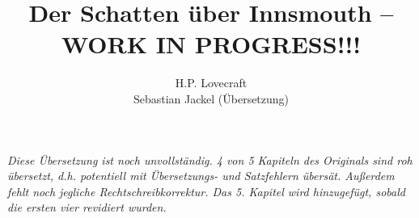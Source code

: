 \documentclass[a4paper,openany]{memoir}
\begin{document}
\title{Der Schatten über Innsmouth -- WORK IN PROGRESS!!!}
\author{H.P. Lovecraft\\
		Sebastian Jackel (Übersetzung)}
\date{}
\maketitle

\textit{Diese Übersetzung ist noch unvollständig. 4 von 5 Kapiteln des Originals sind roh übersetzt, d.h. potentiell mit Übersetzungs- und Satzfehlern übersät. Außerdem fehlt noch jegliche Rechtschreibkorrektur. Das 5. Kapitel wird hinzugefügt, sobald die ersten vier revidiert wurden.}






\end{document}
